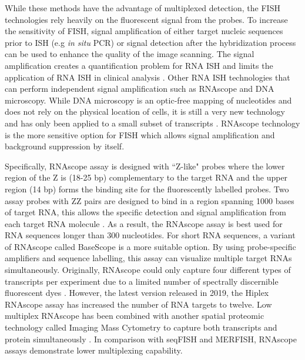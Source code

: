 While these methods have the advantage of multiplexed detection, the FISH technologies rely heavily on the fluorescent signal from the probes. To increase the sensitivity of FISH, signal amplification of either target nucleic sequences prior to ISH (e.g \textit{in situ} PCR) or signal detection after the hybridization process \cite{qian2003recent} can be used to enhance the quality of the image scanning. The signal amplification creates a quantification problem for RNA ISH and limits the application of RNA ISH in clinical analysis \cite{levsky2003fluorescence,wang2012rnascope}. Other RNA ISH technologies that can perform independent signal amplification such as RNAscope and DNA microscopy. While DNA microscopy is an optic-free mapping of nucleotides and does not rely on the physical location of cells, it is still a very new technology and has only been applied to a small subset of transcripts \cite{asp2020spatially,weinstein2019dna}. RNAscope technology is the more sensitive option for FISH which allows signal amplification and background suppression by itself.

Specifically, RNAscope assay is designed with ``Z-like" probes where the lower region of the Z is (18-25 bp) complementary to the target RNA and the upper region (14 bp) forms the binding site for the fluorescently labelled probes. Two assay probes with ZZ pairs are designed to bind in a region spanning 1000 bases of target RNA, this allows the specific detection and signal amplification from each target RNA molecule \cite{solanki2020visualization}. As a result, the RNAscope assay is best used for RNA sequences longer than 300 nucleotides. For short RNA sequences, a variant of RNAscope called BaseScope is a more suitable option. By using probe-specific amplifiers and sequence labelling, this assay can visualize multiple target RNAs simultaneously. Originally, RNAscope could only capture four different types of transcripts per experiment due to a limited number of spectrally discernible fluorescent dyes \cite{wang2012rnascope}. However, the latest version released in 2019, the Hiplex RNAscope assay has increased the number of RNA targets to twelve. Low multiplex RNAscope has been combined with another spatial proteomic technology called Imaging Mass Cytometry to capture both transcripts and protein simultaneously \cite{schulz2018simultaneous}. In comparison with seqFISH and MERFISH, RNAscope assays demonstrate lower multiplexing capability. 

